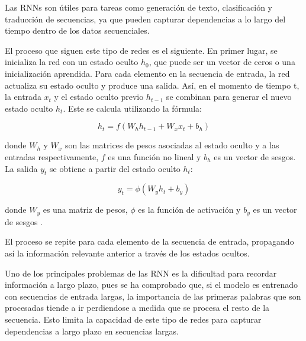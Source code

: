 \documentclass[11pt,spanish,listoffigures,listoftables]{tfgetsinf}
\begin{document}
Las RNNs son útiles para tareas como generación de texto, clasificación y traducción de secuencias, ya que pueden capturar dependencias a lo largo del tiempo dentro de los datos secuenciales.

El proceso que siguen este tipo de redes es el siguiente. En primer lugar, se inicializa la red con un estado oculto $h_0$, que puede ser un vector de ceros o una inicialización aprendida. Para cada elemento en la secuencia de entrada, la red actualiza su estado oculto y produce una salida. Así, en el momento de tiempo t, la entrada $x_t$ y el estado oculto previo $h_{t-1}$ se combinan para generar el nuevo estado oculto $h_t$. Este se calcula utilizando la fórmula:

\begin{equation}
h_t = f(W_hh_{t-1} + W_xx_t + b_h)
\end{equation}

donde $W_h$ y $W_x$ son las matrices de pesos asociadas al estado oculto y a las entradas respectivamente, $f$ es una función no lineal y $b_h$ es un vector de sesgos. La salida $y_t$ se obtiene a partir del estado oculto $h_t$:

\begin{equation}
y_t = \phi(W_yh_t + b_y)
\end{equation}

donde $W_y$ es una matriz de pesos, $\phi$ es la función de activación y $b_y$ es un vector de sesgos \cite{sutskever2014sequencesequencelearningneural}.

El proceso se repite para cada elemento de la secuencia de entrada, propagando así la información relevante anterior a través de los estados ocultos.

Uno de los principales problemas de las RNN es la dificultad para recordar información a largo plazo, pues se ha comprobado que, si el modelo es entrenado con secuencias de entrada largas, la importancia de las primeras palabras que son procesadas tiende a ir perdiendose a medida que se procesa el resto de la secuencia. Esto limita la capacidad de este tipo de redes para capturar dependencias a largo plazo en secuencias largas.

\end{document}
